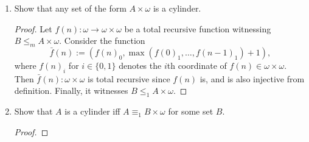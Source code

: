\documentclass{article}
\begin{document}
\begin{enumerate}[label={\bf Q\arabic*:}]
\begin{enumerate}[label={\bf (\roman*)}]
      \item Show that any set of the form $A\times\omega$ is a cylinder.
        \begin{proof}
          Let $f(n):\omega\rightarrow\omega\times\omega$ be a total
          recursive function witnessing $B\leq_m A\times\omega$. Consider
          the function
          \[\bar{f}(n):= (f(n)_0,\max(f(0)_1,\ldots,f(n-1)_1)+1),\]
          where $f(n)_i$ for $i\in\{0,1\}$ denotes the $i$th coordinate of
          $f(n)\in\omega\times\omega$. Then $\bar{f}(n):\omega\times\omega$
          is total recursive since $f(n)$ is, and is also injective from
          definition. Finally, it witnesses $B\leq_1A\times\omega$.
        \end{proof}

      \item Show that $A$ is a cylinder iff $A\equiv_1B\times\omega$ for
        some set $B$.
        \begin{proof}
        \end{proof}
    \end{enumerate}
\end{enumerate}
\end{document}
